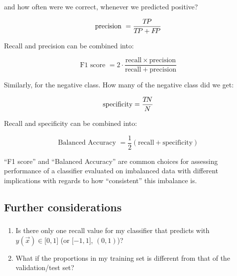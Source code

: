 \begin{frame}
{and how often were we correct, whenever we predicted positive?

\begin{equation}
\text{precision }
 = \frac{T\kern-.4exP}{T\kern-.4exP+F\kern-.5exP}
\end{equation}

Recall and precision can be combined into:

\begin{equation}
\text{F1 score }
 = 2 \cdot \frac{\mathrm{recall} \times \mathrm{precision}}{\mathrm{recall} + \mathrm{precision}}
\end{equation}

Similarly, for the negative class. How many of the negative class did we get:

\begin{equation}
\text{specificity}
 = \frac{T\kern-.5exN}{N}
\end{equation}


Recall and specificity can be combined into:


\begin{equation}
\text{Balanced Accuracy }
 = \frac{1}{2} (\mathrm{recall} + \mathrm{specificity})
\end{equation}

``F1 score'' and ``Balanced Accuracy'' are common choices for assessing performance of a classifier evaluated on imbalanced data with different implications with regards to how ``consistent'' this imbalance is. 

}

\end{frame}

\subsection{Further considerations}

\begin{frame}\frametitle{\subsecname}

\begin{enumerate}
\item
Is there only one recall value for my classifier that predicts with\\
 $y(\vec x) \in \lbrack0,1\rbrack$ (or $\lbrack-1,1\rbrack$, $(0,1)$)?
\item
What if the proportions in my training set is different from that of the validation/test set?
\end{enumerate}


\end{frame}

